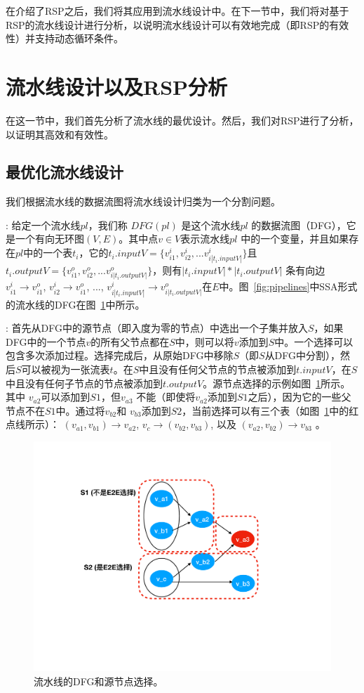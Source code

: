 在介绍了RSP之后，我们将其应用到流水线设计中。在下一节中，我们将对基于RSP的流水线设计进行分析，以说明流水线设计可以有效地完成（即RSP的有效性）并支持动态循环条件。



\section{流水线设计以及RSP分析}
\label{sec:analysis}

在这一节中，我们首先分析了流水线的最优设计。然后，我们对RSP进行了分析，以证明其高效和有效性。

\subsection{最优化流水线设计}
我们根据流水线的数据流图将流水线设计归类为一个分割问题。

: 给定一个流水线$pl$，我们称 $DFG(pl)$ 是这个流水线$pl$ 的数据流图（DFG），它是一个有向无环图$(V, E)$。其中点$v \in V$表示流水线$pl$ 中的一个变量，并且如果存在$pl$中的一个表$t_i$，它的$t_i.inputV = \{v_{i1}^i, v_{i2}^i, ... v_{i|t_i.inputV|}^i\}$且$t_i.outputV = \{v_{i1}^o, v_{i2}^o, ... v_{i|t_i.outputV|}^o\}$，则有$|t_i.inputV| * |t_i.outputV|$ 条有向边 $v_{i1}^i \to v_{i1}^o$, $v_{i2}^i \to v_{i1}^o$, ..., $v_{i|t_i.inputV|}^i \to v_{i|t_i.outputV|}^o$在$E$中。图~\ref{fig:pipelines}中SSA形式的流水线的DFG在图~\ref{fig:dfg}中所示。

: 首先从DFG中的源节点（即入度为零的节点）中选出一个子集并放入$S$，如果DFG中的一个节点$v$的所有父节点都在$S$中，则可以将$v$添加到$S$中。一个选择可以包含多次添加过程。选择完成后，从原始DFG中移除$S$（即$S$从DFG中分割），然后$S$可以被视为一张流表$t$。在$S$中且没有任何父节点的节点被添加到$t.inputV$，在$S$中且没有任何子节点的节点被添加到$t.outputV$。源节点选择的示例如图~\ref{fig:dfg}所示。其中 $v_{a2}$可以添加到$S1$，但$v_{a3}$ 不能（即使将$v_{a2}$添加到$S1$之后），因为它的一些父节点不在$S1$中。通过将$v_{b2}$和 $v_{b3}$添加到$S2$，当前选择可以有三个表（如图~\ref{fig:dfg}中的红点线所示）： $(v_{a1}, v_{b1}) \rightarrow v_{a2}$, $v_c \rightarrow (v_{b2}, v_{b3})$, 以及 $(v_{a2}, v_{b2}) \rightarrow v_{b3}$ 。

\begin{figure}[!htbp]
\includegraphics[width=0.6\linewidth]{figures/lp-67.pdf}
\centering
\vspace{-3mm}
\caption{\small 流水线的DFG和源节点选择。}
\label{fig:dfg}
\end{figure}

